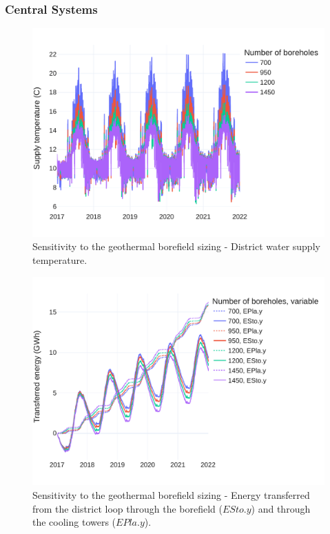 \subsubsection{Central Systems} \label{sec:dhc}

\begin{figure}[!htbp]
\centering
\includegraphics[width=.7\linewidth]{../python_scripts/figures/GeoSizing.pdf}
\caption{Sensitivity to the geothermal borefield sizing - District water supply temperature.}
\label{fig:geo_sizing}
\end{figure}

\begin{figure}[!htbp]
\centering
\includegraphics[width=.7\linewidth]{../python_scripts/figures/GeoSizingE.pdf}
\caption{Sensitivity to the geothermal borefield sizing - Energy transferred from the district loop through the borefield ($ESto.y$) and through the cooling towers ($EPla.y$).}
\label{fig:geo_cooling}
\end{figure}



